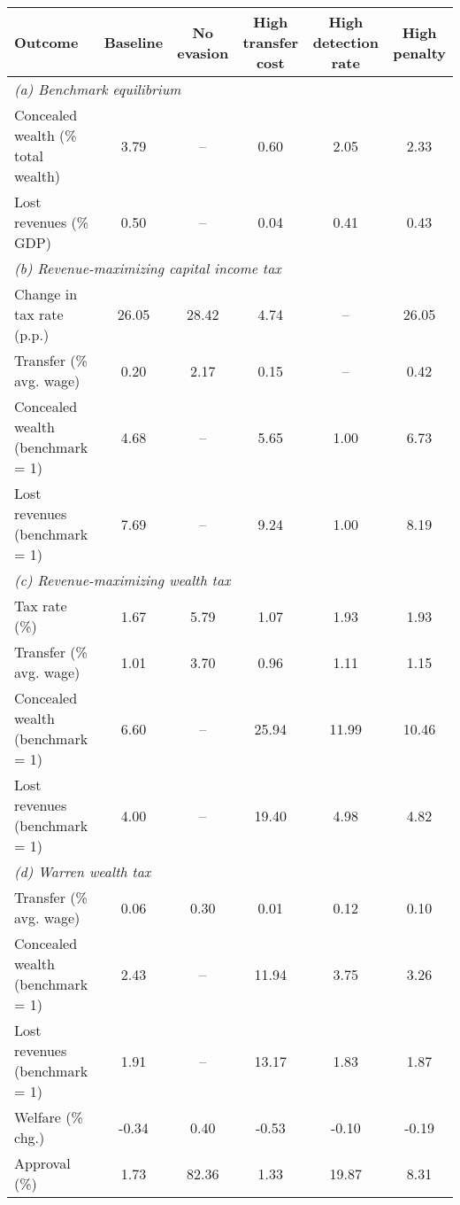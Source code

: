 \footnotesize
\renewcommand{\arraystretch}{1.2}
\renewcommand{\cellalign}{bc}
\begin{tabular}{lccccc}
\toprule
Outcome & Baseline & \makecell{No\\evasion} & \makecell{High\\transfer cost} & \makecell{High\\detection rate} & \makecell{High\\penalty}\\
\midrule\multicolumn{6}{l}{{\textit{(a) Benchmark equilibrium}}}\\
Concealed wealth (\% total wealth)&3.79&--&0.60&2.05&2.33\\
Lost revenues (\% GDP)&0.50&--&0.04&0.41&0.43\\
[1ex]\multicolumn{6}{l}{{\textit{(b) Revenue-maximizing capital income tax}}}\\
Change in tax rate (p.p.)&26.05&28.42&4.74&--&26.05\\
Transfer (\% avg. wage)&0.20&2.17&0.15&--&0.42\\
Concealed wealth (benchmark = 1)&4.68&--&5.65&1.00&6.73\\
Lost revenues (benchmark = 1)&7.69&--&9.24&1.00&8.19\\
[1ex]\multicolumn{6}{l}{{\textit{(c) Revenue-maximizing wealth tax}}}\\
Tax rate (\%)&1.67&5.79&1.07&1.93&1.93\\
Transfer (\% avg. wage)&1.01&3.70&0.96&1.11&1.15\\
Concealed wealth (benchmark = 1)&6.60&--&25.94&11.99&10.46\\
Lost revenues (benchmark = 1)&4.00&--&19.40&4.98&4.82\\
[1ex]\multicolumn{6}{l}{\textit{(d) Warren wealth tax}}\\
Transfer (\% avg. wage)&0.06&0.30&0.01&0.12&0.10\\
Concealed wealth (benchmark = 1)&2.43&--&11.94&3.75&3.26\\
Lost revenues (benchmark = 1)&1.91&--&13.17&1.83&1.87\\
Welfare (\% chg.)&-0.34&0.40&-0.53&-0.10&-0.19\\
Approval (\%)&1.73&82.36&1.33&19.87&8.31\\
\bottomrule
\end{tabular}
\normalsize

